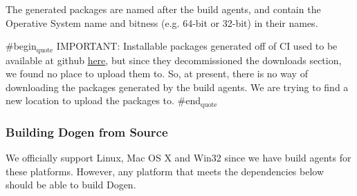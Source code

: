 \documentclass[11pt]{article}
\begin{document}
The generated packages are named after the build agents, and contain
the Operative System name and bitness (e.g. 64-bit or 32-bit) in their
names.

\#begin$_{\text{quote}}$
IMPORTANT: Installable packages generated off of CI used to be available at
github \href{https://github.com/DomainDrivenConsulting/dogen/downloads}{here}, but since they decommissioned the downloads section, we
found no place to upload them to. So, at present, there is no way of
downloading the packages generated by the build agents. We are trying
to find a new location to upload the packages to.
\#end$_{\text{quote}}$

\subsubsection{Building Dogen from Source}
\label{sec-3-1-2}

We officially support Linux, Mac OS X and Win32 since we have build
agents for these platforms. However, any platform that meets the
dependencies below should be able to build Dogen.
\end{document}
